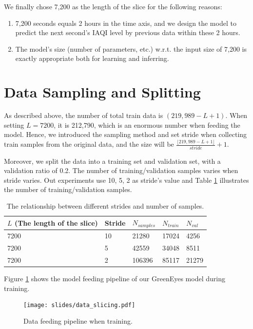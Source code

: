 We finally chose 7,200 as the length of the slice for the following reasons:
\begin{enumerate}
    \item 7,200 seconds equals 2 hours in the time axis, and we design the model to predict the next second's IAQI level by previous data within these 2 hours.
    \item The model's size (number of parameters, etc.) w.r.t. the input size of 7,200 is exactly appropriate both for learning and inferring.
\end{enumerate}

\section{Data Sampling and Splitting}

As described above, the number of total train data is $(219,989-L+1)$. When setting $L=7200$, it is 212,790, which is an enormous number when feeding the model. Hence, we introduced the sampling method and set stride when collecting train samples from the original data, and the size will be $\frac{\lfloor 219,989-L+1 \rfloor}{stride}+1$. 

Moreover, we split the data into a training set and validation set, with a validation ratio of 0.2. The number of training/validation samples varies when stride varies. Out experiments use 10, 5, 2 as stride's value and Table \ref{table:N_samples} illustrates the number of training/validation samples.

\begin{table}[!htbp]
    \centering
    \begin{tabular}{|l|l|l|l|l|}
    \hline
    $L$ (The length of the slice) & Stride & $N_{samples}$ & $N_{train}$ & $N_{val}$ \\ \hline
    7200 & 10 & 21280  & 17024  & 4256  \\ \hline
    7200 & 5  & 42559  & 34048  & 8511  \\ \hline
    7200 & 2  & 106396 & 85117  & 21279 \\ \hline
    \end{tabular}
    \caption{The relationship between different strides and number of samples.}
    \label{table:N_samples}
\end{table}

Figure \ref{fig:model_feeding_pipeline} shows the model feeding pipeline of our GreenEyes model during training.

\begin{figure}[!htbp]
    \centering
    \texttt{[image: slides/data\_slicing.pdf]}
    \caption{Data feeding pipeline when training.}
    \label{fig:model_feeding_pipeline}
\end{figure}

